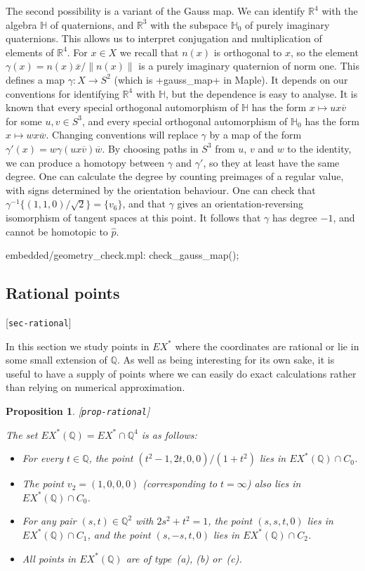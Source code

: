 \documentclass[reqno]{amsart}
\newcommand{\lbl}[1]{\label{#1}\textup{[\texttt{#1}]}\par}
\newcommand{\lbl}{\label}
\newcommand{\gm}        {\gamma}
\newcommand{\Q}         {{\mathbb{Q}}}
\newcommand{\R}         {{\mathbb{R}}}
\renewcommand{\H}       {{\mathbb{H}}}
\newcommand{\ov}[1]     {\overline{#1}}
\newcommand{\rt}        {\sqrt{2}}
\newcommand{\hp}        {\widehat{p}}
\renewcommand{\:}{\colon}
\newtheorem{proposition}[theorem]{Proposition}
\theoremstyle{definition}
\begin{document}
The second possibility is a variant of the Gauss map.  We can identify
$\R^4$ with the algebra $\H$ of quaternions, and $\R^3$ with the
subspace $\H_0$ of purely imaginary quaternions.  This allows us to
interpret conjugation and multiplication of elements of $\R^4$.  For
$x\in X$ we recall that $n(x)$ is orthogonal to $x$, so the element
$\gm(x)=n(x)\ov{x}/\|n(x)\|$ is a purely imaginary quaternion of norm
one.  This defines a map $\gm\:X\to S^2$ (which is \mcode+gauss_map+
in Maple).  It depends on our conventions for identifying $\R^4$ with
$\H$, but the dependence is easy to analyse.  It is known that every
special orthogonal automorphism of $\H$ has the form
$x\mapsto ux\ov{v}$ for some $u,v\in S^3$, and every special
orthogonal automorphism of $\H_0$ has the form $x\mapsto wx\ov{w}$.
Changing conventions will replace $\gm$ by a map of the form
$\gm'(x)=w\gm(ux\ov{v})\ov{w}$.  By choosing paths in $S^3$ from $u$,
$v$ and $w$ to the identity, we can produce a homotopy between $\gm$
and $\gm'$, so they at least have the same degree.  One can calculate
the degree by counting preimages of a regular value, with signs
determined by the orientation behaviour.  One can check that
$\gm^{-1}\{(1,1,0)/\rt\}=\{v_6\}$, and that $\gm$ gives an
orientation-reversing isomorphism of tangent spaces at this point.  It
follows that $\gm$ has degree $-1$, and cannot be homotopic to $\hp$.
\begin{checks}
 embedded/geometry_check.mpl: check_gauss_map();
\end{checks}

\subsection{Rational points}
\lbl{sec-rational}

In this section we study points in $EX^*$ where the coordinates are
rational or lie in some small extension of $\Q$.  As well as being
interesting for its own sake, it is useful to have a supply of points
where we can easily do exact calculations rather than relying on
numerical approximation.

\begin{proposition}\lbl{prop-rational}
 The set $EX^*(\Q)=EX^*\cap\Q^4$ is as follows:
 \begin{itemize}
  \item[(a)] For every $t\in\Q$, the point $(t^2-1,2t,0,0)/(1+t^2)$ lies in
   $EX^*(\Q)\cap C_0$.
  \item[(b)] The point $v_2=(1,0,0,0)$ (corresponding to $t=\infty$)
   also lies in $EX^*(\Q)\cap C_0$.
  \item[(c)] For any pair $(s,t)\in\Q^2$ with $2s^2+t^2=1$, the point
   $(s,s,t,0)$ lies in $EX^*(\Q)\cap C_1$, and the point $(s,-s,t,0)$ lies
   in $EX^*(\Q)\cap C_2$.
  \item[(d)] All points in $EX^*(\Q)$ are of type~(a), (b) or~(c).
 \end{itemize}
\end{proposition}
\end{document}
